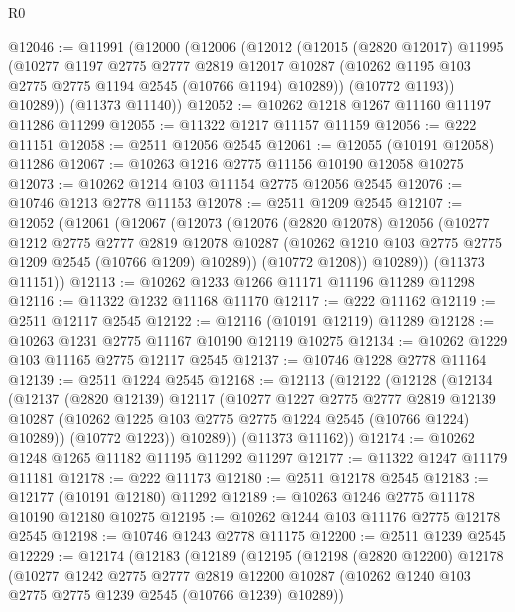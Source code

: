 \begin{lexlean}{R0}
\begin{coremodule}
@12046 := @11991
    (@12000
      (@12006
        (@12012
          (@12015
            (@2820 @12017)
            @11995
            (@10277
              @1197
              @2775
              @2777
              @2819
              @12017
              @10287
              (@10262 @1195 @103 @2775 @2775 @1194 @2545 (@10766 @1194) @10289))
            (@10772 @1193))
          @10289))
      (@11373 @11140))
@12052 := @10262 @1218 @1267 @11160 @11197 @11286 @11299
@12055 := @11322 @1217 @11157 @11159
@12056 := @222 @11151
@12058 := @2511 @12056 @2545
@12061 := @12055 (@10191 @12058) @11286
@12067 := @10263 @1216 @2775 @11156 @10190 @12058 @10275
@12073 := @10262 @1214 @103 @11154 @2775 @12056 @2545
@12076 := @10746 @1213 @2778 @11153
@12078 := @2511 @1209 @2545
@12107 := @12052
    (@12061
      (@12067
        (@12073
          (@12076
            (@2820 @12078)
            @12056
            (@10277
              @1212
              @2775
              @2777
              @2819
              @12078
              @10287
              (@10262 @1210 @103 @2775 @2775 @1209 @2545 (@10766 @1209) @10289))
            (@10772 @1208))
          @10289))
      (@11373 @11151))
@12113 := @10262 @1233 @1266 @11171 @11196 @11289 @11298
@12116 := @11322 @1232 @11168 @11170
@12117 := @222 @11162
@12119 := @2511 @12117 @2545
@12122 := @12116 (@10191 @12119) @11289
@12128 := @10263 @1231 @2775 @11167 @10190 @12119 @10275
@12134 := @10262 @1229 @103 @11165 @2775 @12117 @2545
@12137 := @10746 @1228 @2778 @11164
@12139 := @2511 @1224 @2545
@12168 := @12113
    (@12122
      (@12128
        (@12134
          (@12137
            (@2820 @12139)
            @12117
            (@10277
              @1227
              @2775
              @2777
              @2819
              @12139
              @10287
              (@10262 @1225 @103 @2775 @2775 @1224 @2545 (@10766 @1224) @10289))
            (@10772 @1223))
          @10289))
      (@11373 @11162))
@12174 := @10262 @1248 @1265 @11182 @11195 @11292 @11297
@12177 := @11322 @1247 @11179 @11181
@12178 := @222 @11173
@12180 := @2511 @12178 @2545
@12183 := @12177 (@10191 @12180) @11292
@12189 := @10263 @1246 @2775 @11178 @10190 @12180 @10275
@12195 := @10262 @1244 @103 @11176 @2775 @12178 @2545
@12198 := @10746 @1243 @2778 @11175
@12200 := @2511 @1239 @2545
@12229 := @12174
    (@12183
      (@12189
        (@12195
          (@12198
            (@2820 @12200)
            @12178
            (@10277
              @1242
              @2775
              @2777
              @2819
              @12200
              @10287
              (@10262 @1240 @103 @2775 @2775 @1239 @2545 (@10766 @1239) @10289))

\end{coremodule}
\end{lexlean}
